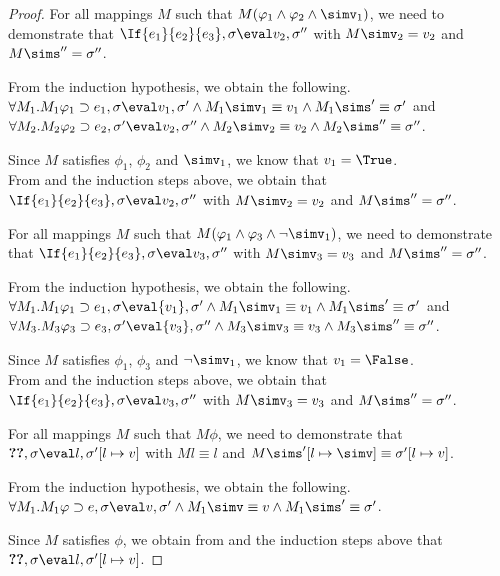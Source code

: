 \begin{proof}
   {For all mappings $M$
   such that $M(\phi_1\land \phi_2 \land \simv_1)$, we need to demonstrate that
   $\If{e_1}{e_2}{e_3},\sigma\eval v_2,\sigma''$ with
   $M \simv_2 = {v_2}$ and $M\sims''=\sigma''$.

   From the induction hypothesis, we obtain the following.\\
   $\forall M_1 . M_1\phi_1 \implies e_1,\sigma\eval v_1,\sigma'
   \land M_1\simv_1 \equiv {v_1} \land M_1\sims'\equiv{\sigma'}$
   and
   $\forall M_2 . M_2\phi_2 \implies e_2,\sigma'\eval v_2,\sigma''
   \land M_2 \simv_2 \equiv {v_2} \land M_2\sims'' \equiv{\sigma''}$.

   Since $M$ satisfies $\phi_1$, $\phi_2$ and $\simv_1$, we know that $v_1=\True$.\\
   From  and the induction steps above, we obtain that
   $\If{e_1}{e_2}{e_3},\sigma\eval v_2,\sigma''$ with $M\simv_2={v_2}$ and $M\sims''={\sigma''}$.

   For all mappings $M$ such that $M(\phi_1\land \phi_3 \land \neg \simv_1)$,
   we need to demonstrate that
   $\If{e_1}{e_2}{e_3},\sigma\eval v_3,\sigma''$ with
   $M \simv_3 = {v_3}$ and $M\sims''={\sigma''}$.

   From the induction hypothesis, we obtain the following.\\
   $\forall M_1 . M_1\phi_1 \implies e_1,\sigma\eval{v_1},{\sigma'}
   \land M_1\simv_1 \equiv {v_1} \land M_1\sims'\equiv{\sigma'}$
   and
   $\forall M_3 . M_3\phi_3 \implies e_3,\sigma'\eval{v_3},{\sigma''}
   \land M_3 \simv_3 \equiv {v_3} \land M_3\sims'' \equiv{\sigma''}$.

   Since $M$ satisfies $\phi_1$, $\phi_3$ and $\neg\simv_1$, we know that $v_1=\False$.\\
   From  and the induction steps above, we obtain that
    $\If{e_1}{e_2}{e_3},\sigma\eval v_3,\sigma''$
   with $M\simv_3={v_3}$ and $M\sims''={\sigma''}$.
  }

  {For all mappings $M$ such that $M\phi$,
  we need to demonstrate that
  $\Ref e,\sigma\eval l,\sigma'[l\mapsto v]$ with
  $M l \equiv l$ and $M\sims'[l\mapsto \simv]\equiv{\sigma'}[l\mapsto{v}]$.

  From the induction hypothesis, we obtain the following.\\
  $\forall M_1 .  M_1\phi \implies e, \sigma {\eval}{v},{\sigma'}\land  M_1\simv\equiv {v} \wedge  M_1\sims'\equiv{\sigma'}$.

  Since $M$ satisfies $\phi$,
  we obtain from  and the induction steps above that $\Ref e,\sigma\eval l,\sigma'[l\mapsto v]$.

}
\end{proof}
